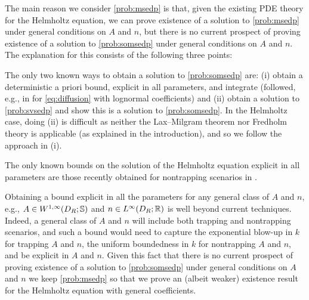 The main reason we consider \cref{prob:msedp} is that, given the existing PDE theory for the Helmholtz equation, we can prove existence of a solution to \cref{prob:msedp} under general conditions on $A$ and $n$, but there is no current prospect of proving existence of a solution to \cref{prob:somsedp} under general conditions on $A$ and $n$. The explanation for this consists of the following three points:
\ben
\item The only two known ways to obtain a solution to \cref{prob:somsedp} are: (i) obtain a deterministic a priori bound, explicit in all parameters, and integrate (followed, e.g., in \cite{ChScTe:13} for \eqref{eq:diffusion} with lognormal coefficients) and (ii) obtain a solution to \cref{prob:svsedp} and show this is a solution to \cref{prob:somsedp}. In the Helmholtz case, doing (ii) is difficult as neither the Lax--Milgram theorem nor Fredholm theory is applicable (as explained in the introduction), and so we follow the approach in (i).
\item The only known bounds on the solution of the Helmholtz equation explicit in all parameters are those recently obtained for nontrapping scenarios in \cite{GrPeSp:19,GaSpWu:18}.
\item Obtaining a bound explicit in all the parameters for any general class of $A$ and $n$, e.g., $A \in \WoiDRRRdtd$ and $n \in \LiDRRR$ is well beyond current techniques. Indeed, a general class of $A$ and $n$ will include both trapping and nontrapping scenarios, and such a bound would need to capture the exponential blow-up in $k$ for trapping $A$ and $n$, the uniform boundedness in $k$ for nontrapping $A$ and $n$, and be explicit in $A$ and $n$.
\een
Given this fact that there is no current prospect of proving existence of a solution to \cref{prob:somsedp} under general conditions on $A$ and $n$ we keep \cref{prob:msedp} so that we prove an (albeit weaker) existence result for the Helmholtz equation with general coefficients.


